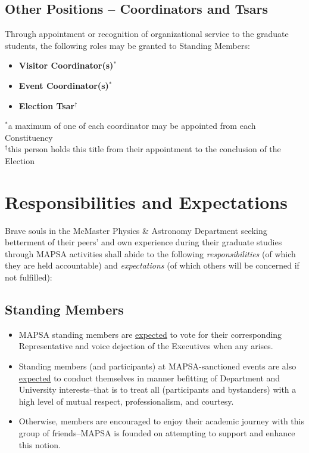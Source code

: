 \documentclass[8pt]{article}
\begin{document}
	\subsection{Other Positions -- Coordinators and Tsars}\label{subsec:others}
	Through appointment or recognition of organizational service to the graduate students, the following roles may be granted to Standing Members:
	\begin{itemize}
		\item \textbf{Visitor Coordinator(s)$^*$}
		\item \textbf{Event Coordinator(s)$^*$}
		\item \textbf{Election Tsar$^\dagger$}
	\end{itemize}
	$^*$a maximum of one of each coordinator may be appointed from each Constituency\\
	$^\dagger$this person holds this title from their appointment to the conclusion of the Election
	\section{Responsibilities and Expectations}
	Brave souls in the McMaster Physics \& Astronomy Department seeking betterment of their peers' and own experience during their graduate studies through MAPSA activities shall abide to the following \textit{responsibilities} (of which they are held accountable) and \textit{expectations} (of which others will be concerned if not fulfilled):
	\subsection{Standing Members}
	\begin{itemize}
		\item MAPSA standing members are \underline{expected} to vote for their corresponding Representative and voice dejection of the Executives when any arises. 
		\item Standing members (and participants) at MAPSA-sanctioned events are also \underline{expected} to conduct themselves in manner befitting of Department and University interests--that is to treat all (participants and bystanders) with a high level of mutual respect, professionalism, and courtesy. 
		\item Otherwise, members are encouraged to enjoy their academic journey with this group of friends--MAPSA is founded on attempting to support and enhance this notion.
	\end{itemize}
\end{document}
